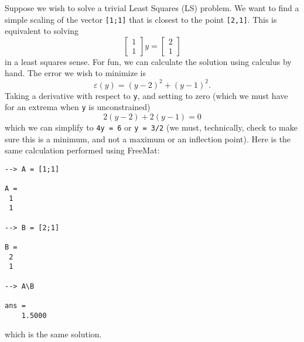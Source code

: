 Suppose we wish to solve a trivial Least Squares (LS) problem.  We want to find a simple scaling of the vector \verb|[1;1]| that is closest to the point \verb|[2,1]|.  This is equivalent to solving
\[
\begin{bmatrix} 1 \\ 1 \end{bmatrix} y = \begin{bmatrix} 2 \\ 1 \end{bmatrix}
\]
in a least squares sense.  For fun, we can calculate the solution using calculus by hand.  The error we wish to minimize is
\[
  \varepsilon(y) = (y - 2)^2 + (y-1)^2.
\]
Taking a derivative with respect to \verb|y|, and setting to zero (which we must have for an extrema when \verb|y| is unconstrained)
\[
  2 (y-2) + 2 (y-1) = 0
\]
which we can simplify to \verb|4y = 6| or \verb|y = 3/2| (we must, technically, check to make sure this is a minimum, and not a maximum or an inflection point).  Here is the same calculation performed using FreeMat:
\begin{verbatim}
--> A = [1;1]

A = 
 1 
 1 

--> B = [2;1]

B = 
 2 
 1 

--> A\B

ans = 
    1.5000 
\end{verbatim}
which is the same solution.
